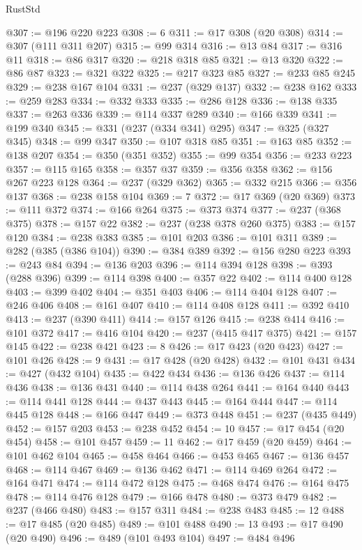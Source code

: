 \begin{lexlean}{RustStd}
\begin{coremodule}
@307 := @196 @220 @223
@308 := 6
@311 := @17 @308 (@20 @308)
@314 := @307 (@111 @311 @207)
@315 := @99 @314
@316 := @13 @84
@317 := @316 @11
@318 := @86 @317
@320 := @218 @318 @85
@321 := @13 @320
@322 := @86 @87
@323 := @321 @322
@325 := @217 @323 @85
@327 := @233 @85 @245
@329 := @238 @167 @104
@331 := @237 (@329 @137)
@332 := @238 @162
@333 := @259 @283
@334 := @332 @333
@335 := @286 @128
@336 := @138 @335
@337 := @263 @336
@339 := @114 @337 @289
@340 := @166 @339
@341 := @199 @340
@345 := @331 (@237 (@334 @341) @295)
@347 := @325 (@327 @345)
@348 := @99 @347
@350 := @107 @318 @85
@351 := @163 @85
@352 := @138 @207
@354 := @350 (@351 @352)
@355 := @99 @354
@356 := @233 @223
@357 := @115 @165
@358 := @357 @37
@359 := @356 @358
@362 := @156 @267 @223 @128
@364 := @237 (@329 @362)
@365 := @332 @215
@366 := @356 @137
@368 := @238 @158 @104
@369 := 7
@372 := @17 @369 (@20 @369)
@373 := @111 @372
@374 := @166 @264
@375 := @373 @374
@377 := @237 (@368 @375)
@378 := @157 @22
@382 := @237 (@238 @378 @260 @375)
@383 := @157 @120
@384 := @238 @383
@385 := @101 @203
@386 := @101 @311
@389 := @282 (@385 (@386 @104))
@390 := @384 @389
@392 := @156 @280 @223
@393 := @243 @84
@394 := @136 @203
@396 := @114 @394 @128
@398 := @393 (@288 @396)
@399 := @114 @398
@400 := @357 @22
@402 := @114 @400 @128
@403 := @399 @402
@404 := @351 @403
@406 := @114 @404 @128
@407 := @246 @406
@408 := @161 @407
@410 := @114 @408 @128
@411 := @392 @410
@413 := @237 (@390 @411)
@414 := @157 @126
@415 := @238 @414
@416 := @101 @372
@417 := @416 @104
@420 := @237 (@415 @417 @375)
@421 := @157 @145
@422 := @238 @421
@423 := 8
@426 := @17 @423 (@20 @423)
@427 := @101 @426
@428 := 9
@431 := @17 @428 (@20 @428)
@432 := @101 @431
@434 := @427 (@432 @104)
@435 := @422 @434
@436 := @136 @426
@437 := @114 @436
@438 := @136 @431
@440 := @114 @438 @264
@441 := @164 @440
@443 := @114 @441 @128
@444 := @437 @443
@445 := @164 @444
@447 := @114 @445 @128
@448 := @166 @447
@449 := @373 @448
@451 := @237 (@435 @449)
@452 := @157 @203
@453 := @238 @452
@454 := 10
@457 := @17 @454 (@20 @454)
@458 := @101 @457
@459 := 11
@462 := @17 @459 (@20 @459)
@464 := @101 @462 @104
@465 := @458 @464
@466 := @453 @465
@467 := @136 @457
@468 := @114 @467
@469 := @136 @462
@471 := @114 @469 @264
@472 := @164 @471
@474 := @114 @472 @128
@475 := @468 @474
@476 := @164 @475
@478 := @114 @476 @128
@479 := @166 @478
@480 := @373 @479
@482 := @237 (@466 @480)
@483 := @157 @311
@484 := @238 @483
@485 := 12
@488 := @17 @485 (@20 @485)
@489 := @101 @488
@490 := 13
@493 := @17 @490 (@20 @490)
@496 := @489 (@101 @493 @104)
@497 := @484 @496

\end{coremodule}
\end{lexlean}
